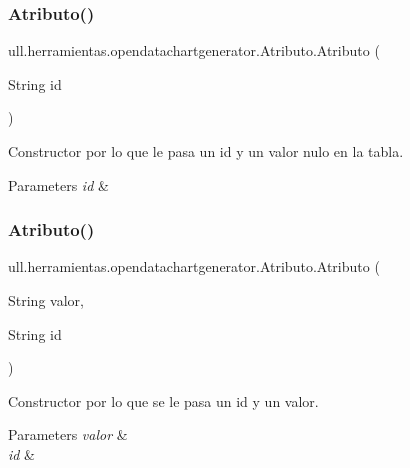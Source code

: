 \subsubsection{\texorpdfstring{Atributo()}{Atributo()}\hspace{0.1cm}{\footnotesize\ttfamily [1/2]}}
{\footnotesize\ttfamily ull.\+herramientas.\+opendatachartgenerator.\+Atributo.\+Atributo (\begin{DoxyParamCaption}\item[{String}]{id }\end{DoxyParamCaption})}



Constructor por lo que le pasa un id y un valor nulo en la tabla. 


\begin{DoxyParams}{Parameters}
{\em id} & \\
\hline
\end{DoxyParams}
\mbox{\label{classull_1_1herramientas_1_1opendatachartgenerator_1_1_atributo_a25e5efe2746d3237f3f2db3b09c37829}} 
\subsubsection{\texorpdfstring{Atributo()}{Atributo()}\hspace{0.1cm}{\footnotesize\ttfamily [2/2]}}
{\footnotesize\ttfamily ull.\+herramientas.\+opendatachartgenerator.\+Atributo.\+Atributo (\begin{DoxyParamCaption}\item[{String}]{valor,  }\item[{String}]{id }\end{DoxyParamCaption})}



Constructor por lo que se le pasa un id y un valor. 


\begin{DoxyParams}{Parameters}
{\em valor} & \\
\hline
{\em id} & \\
\hline
\end{DoxyParams}


